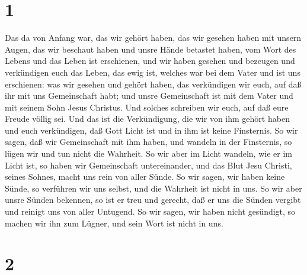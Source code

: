 \hypertarget{section}{%
\section{1}\label{section}}

 Das da von Anfang war, das wir gehört haben, das wir
gesehen haben mit unsern Augen, das wir beschaut haben und unsre Hände
betastet haben, vom Wort des Lebens  und das Leben ist
erschienen, und wir haben gesehen und bezeugen und verkündigen euch das
Leben, das ewig ist, welches war bei dem Vater und ist uns erschienen:
 was wir gesehen und gehört haben, das verkündigen wir euch,
auf daß ihr mit uns Gemeinschaft habt; und unsre Gemeinschaft ist mit
dem Vater und mit seinem Sohn Jesus Christus.  Und solches
schreiben wir euch, auf daß eure Freude völlig sei.  Und das
ist die Verkündigung, die wir von ihm gehört haben und euch verkündigen,
daß Gott Licht ist und in ihm ist keine Finsternis.  So wir
sagen, daß wir Gemeinschaft mit ihm haben, und wandeln in der
Finsternis, so lügen wir und tun nicht die Wahrheit.  So wir
aber im Licht wandeln, wie er im Licht ist, so haben wir Gemeinschaft
untereinander, und das Blut Jesu Christi, seines Sohnes, macht uns rein
von aller Sünde.  So wir sagen, wir haben keine Sünde, so
verführen wir uns selbst, und die Wahrheit ist nicht in uns.
 So wir aber unsre Sünden bekennen, so ist er treu und
gerecht, daß er uns die Sünden vergibt und reinigt uns von aller
Untugend.  So wir sagen, wir haben nicht gesündigt, so
machen wir ihn zum Lügner, und sein Wort ist nicht in uns.

\hypertarget{section-1}{%
\section{2}\label{section-1}}

